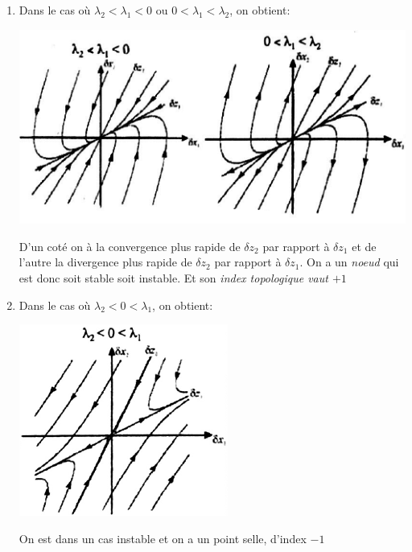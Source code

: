 \documentclass[main.tex]{subfiles}
\begin{document}
\begin{enumerate}

\item Dans le cas où  $\lambda_2 < \lambda_1 < 0$ ou $0 <  \lambda_1 < \lambda_2$, on obtient:
\begin{center}
\includegraphics[scale=0.5]{1/graph3.png}
\end{center}
D'un coté on à la convergence plus rapide de $\delta z_2$ par rapport à $\delta z_1$ et de l'autre la divergence plus rapide de $\delta z_2$ par rapport à $\delta z_1$. On a un \emph{noeud} qui est donc soit stable soit instable. Et son \emph{index topologique vaut $+1$}\\

\item Dans le cas où  $\lambda_2 < 0 < \lambda_1 $, on obtient:
\begin{center}
\includegraphics[scale=0.5]{1/graph4.png}
\end{center}
On est dans un cas instable et on a un point selle, d'index $-1$ \\



\end{enumerate}
\end{document}
